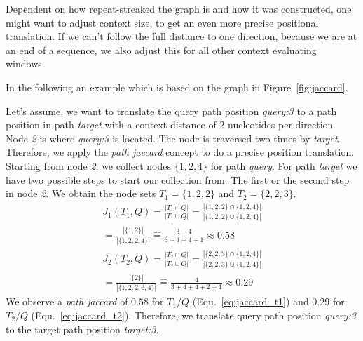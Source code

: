 \documentclass{bioinfo}
\begin{document}
Dependent on how repeat-streaked the graph is and how it was constructed, one might want to adjust context size, to get an even more precise positional translation. If we can't follow the full distance to one direction, because we are at an end of a sequence, we also adjust this for all other context evaluating windows.

In the following an example which is based on the graph in Figure~\ref{fig:jaccard}.

Let's assume, we want to translate the query path position \textit{query:3} to a path position in path \textit{target} with a context distance of 2 nucleotides per direction. Node \textit{2} is where \textit{query:3} is located. The node is traversed two times by \textit{target}. Therefore, we apply the \textit{path jaccard} concept to do a precise position translation. Starting from node \textit{2}, we collect nodes $\{1,2,4\}$ for path \textit{query}. For path \textit{target} we have two possible steps to start our collection from: The first or the second step in node \textit{2}. We obtain the node sets $T_1=\{1,2,2\}$ and $T_2=\{2,2,3\}$.
\begin{multline}
	J_1(T_1,Q)=\frac{|T_1\cap Q|}{|T_1\cup Q|}=\frac{|\{1,2,2\}\cap \{1,2,4\}|}{|\{1,2,2\}\cup \{1,2,4\}|}\\=\frac{|\{1,2\}|}{|\{1,2,2,4\}|}\widehat{=}\frac{3+4}{3+4+4+1}\approx0.58
	\label{eq:jaccard_t1}
\end{multline}
\begin{multline}
	J_2(T_2,Q)=\frac{|T_2\cap Q|}{|T_2\cup Q|}=\frac{|\{2,2,3\}\cap \{1,2,4\}|}{|\{2,2,3\}\cup \{1,2,4\}|}\\=\frac{|\{2\}|}{|\{1,2,2,3,4\}|}\widehat{=}\frac{4}{3+4+4+2+1}\approx0.29
	\label{eq:jaccard_t2}
\end{multline}
We observe a \textit{path jaccard} of $0.58$ for $T_1/Q$ (Equ.~\ref{eq:jaccard_t1}) and $0.29$ for $T_2/Q$ (Equ.~\ref{eq:jaccard_t2}).
Therefore, we translate query path position \textit{query:3} to the target path position \textit{target:3}.
\end{document}
